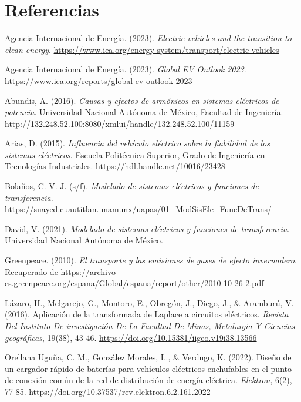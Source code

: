 \section{Referencias}
\renewcommand{\refname}{}  %
\begin{thebibliography}{9}

    Agencia Internacional de Energía. (2023). \textit{Electric vehicles and the transition to clean energy}. \url{https://www.iea.org/energy-system/transport/electric-vehicles}

    Agencia Internacional de Energía. (2023). \textit{Global EV Outlook 2023}. \url{https://www.iea.org/reports/global-ev-outlook-2023}

    Abundis, A. (2016). \textit{Causas y efectos de armónicos en sistemas eléctricos de potencia}. Universidad Nacional Autónoma de México, Facultad de Ingeniería. \url{http://132.248.52.100:8080/xmlui/handle/132.248.52.100/11159}

    Arias, D. (2015). \textit{Influencia del vehículo eléctrico sobre la fiabilidad de los sistemas eléctricos}. Escuela Politécnica Superior, Grado de Ingeniería en Tecnologías Industriales. \url{https://hdl.handle.net/10016/23428}

    Bolaños, C. V. J. (s/f). \textit{Modelado de sistemas eléctricos y funciones de transferencia}. \url{https://suayed.cuautitlan.unam.mx/uapas/01_ModSisEle_FuncDeTrans/}

    David, V. (2021). \textit{Modelado de sistemas eléctricos y funciones de transferencia}. Universidad Nacional Autónoma de México.

    Greenpeace. (2010). \textit{El transporte y las emisiones de gases de efecto invernadero}. Recuperado de \url{https://archivo-es.greenpeace.org/espana/Global/espana/report/other/2010-10-26-2.pdf}

    Lázaro, H., Melgarejo, G., Montoro, E., Obregón, J., Diego, J., \& Aramburú, V. (2016). Aplicación de la transformada de Laplace a circuitos eléctricos. \textit{Revista Del Instituto De investigación De La Facultad De Minas, Metalurgia Y Ciencias geográficas}, 19(38), 43-46. \url{https://doi.org/10.15381/iigeo.v19i38.13566}

    Orellana Uguña, C. M., González Morales, L., \& Verdugo, K. (2022). Diseño de un cargador rápido de baterías para vehículos eléctricos enchufables en el punto de conexión común de la red de distribución de energía eléctrica. \textit{Elektron}, 6(2), 77-85. \url{https://doi.org/10.37537/rev.elektron.6.2.161.2022}


\end{thebibliography}
